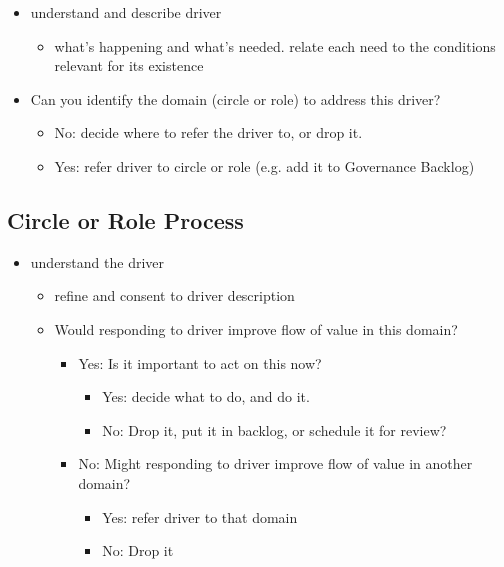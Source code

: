 \begin{itemize}
\item understand and describe driver

\begin{itemize}
\item what's happening and what's needed. relate each need to the conditions relevant for its existence

\end{itemize}

\item Can you identify the domain (circle or role) to address this driver?

\begin{itemize}
\item No: decide where to refer the driver to, or drop it.

\item Yes: refer driver to circle or role (e.g. add it to Governance Backlog)

\end{itemize}

\end{itemize}

\subsection{Circle or Role Process}
\label{circleorroleprocess}

\begin{itemize}
\item understand the driver

\begin{itemize}
\item refine and consent to driver description

\item Would responding to driver improve flow of value in this domain?

\begin{itemize}
\item Yes: Is it important to act on this now?

\begin{itemize}
\item Yes: decide what to do, and do it.

\item No: Drop it, put it in backlog, or schedule it for review?

\end{itemize}

\item No: Might responding to driver improve flow of value in another domain?

\begin{itemize}
\item Yes: refer driver to that domain

\item No: Drop it

\end{itemize}

\end{itemize}

\end{itemize}

\end{itemize}

